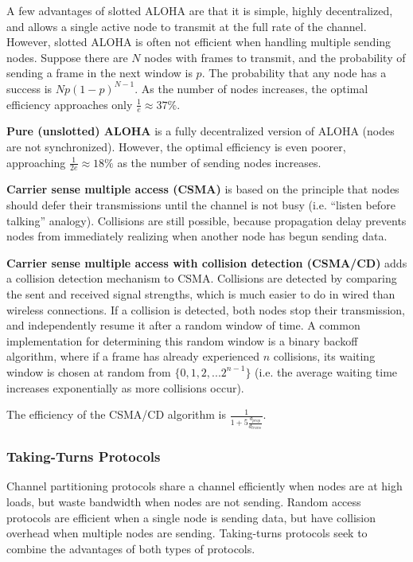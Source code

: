 \documentclass[12pt,titlepage]{article}
\begin{document}
        A few advantages of slotted ALOHA are that it is simple, highly decentralized, and allows a single active node to transmit at the full rate of the channel.
        However, slotted ALOHA is often not efficient when handling multiple sending nodes. Suppose there are $N$ nodes with frames to transmit, and the probability
        of sending a frame in the next window is $p$. The probability that any node has a success is $Np(1-p)^{N-1}$. As the number of nodes increases, the
        optimal efficiency approaches only $\frac{1}{e} \approx 37\%$.

        \textbf{Pure (unslotted) ALOHA} is a fully decentralized version of ALOHA (nodes are not synchronized). However, the optimal efficiency is even poorer,
        approaching $\frac{1}{2e} \approx 18\%$ as the number of sending nodes increases.

        \textbf{Carrier sense multiple access (CSMA)} is based on the principle that nodes should defer their transmissions until the channel is not busy (i.e. ``listen
          before talking'' analogy). Collisions are still possible, because propagation delay prevents nodes from immediately realizing when another node has begun
          sending data.

        \textbf{Carrier sense multiple access with collision detection (CSMA/CD)} adds a collision detection mechanism to CSMA. Collisions are detected by comparing
          the sent and received signal strengths, which is much easier to do in wired than wireless connections. If a collision is detected, both nodes stop their
          transmission, and independently resume it after a random window of time. A common implementation for determining this random window is a binary backoff
          algorithm, where if a frame has already experienced $n$ collisions, its waiting window is chosen at random from $\{0, 1, 2, ... 2^{n-1}\}$ (i.e. the
          average waiting time increases exponentially as more collisions occur).

          The efficiency of the CSMA/CD algorithm is $\frac{1}{1 + 5\frac{d_{prop}}{d_{trans}}}$.

      \subsubsection{Taking-Turns Protocols}
        Channel partitioning protocols share a channel efficiently when nodes are at high loads, but waste bandwidth when nodes are not sending. Random access protocols
        are efficient when a single node is sending data, but have collision overhead when multiple nodes are sending. Taking-turns protocols seek to combine the
        advantages of both types of protocols.
\end{document}
